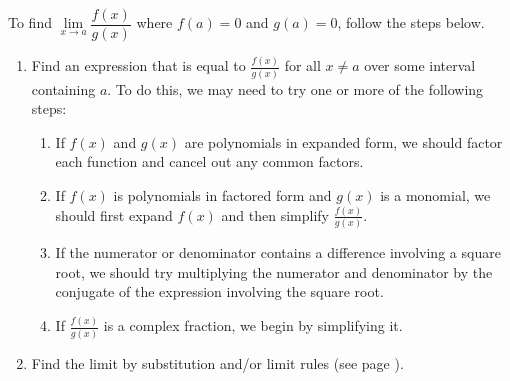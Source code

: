 \begin{tcolorbox}[title = {Calculating a Limit When \(\displaystyle\frac{f(a)}{g(a)}\) has the indeterminate form of $\dfrac{0}{0}$}]
To find \(\lim\limits_{x \to a} \dfrac{f(x)}{g(x)}\) where \(f(a)=0\) and \(g(a)=0\), follow the steps below.
\begin{enumerate}[leftmargin=*]

\item Find an expression that is equal to \(\displaystyle\frac{f(x)}{g(x)}\) for all \(x\ne a\) over some interval containing \(a\). To do this, we may need to try one or more of the following steps:
\begin{enumerate}
    \item If \(f(x)\) and \(g(x)\) are polynomials in expanded form, we should factor each function and cancel out any common factors.
    
    \item If \(f(x)\) is polynomials in factored form and \(g(x)\) is a monomial, we should first expand \(f(x)\) and then simplify \(\displaystyle\frac{f(x)}{g(x)}\).
    
    \item If the numerator or denominator contains a difference involving a square root, we should try multiplying the numerator and denominator by the conjugate of the expression involving the square root.
    \item If \(\displaystyle\frac{f(x)}{g(x)}\) is a complex fraction, we begin by simplifying it.
\end{enumerate}
\item Find the limit by substitution and/or limit rules (see page \pageref{limitRules}).
\end{enumerate}

\end{tcolorbox}

